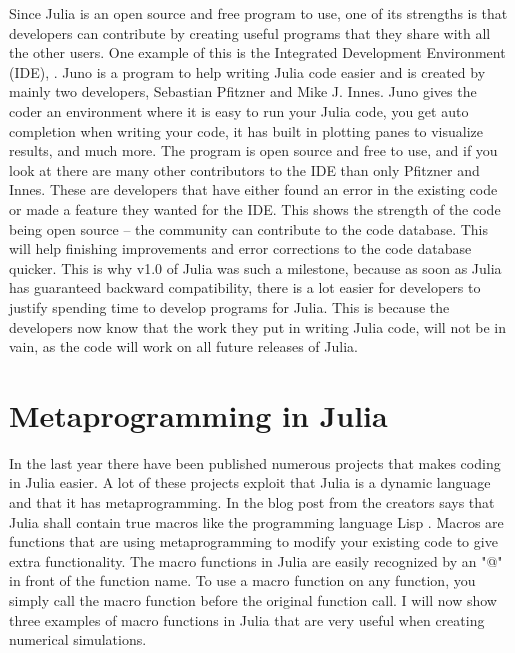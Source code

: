 Since Julia is an open source and free program to use, one of its strengths is that developers can contribute by creating useful programs that they share with all the other users. One example of this is the Integrated Development Environment (IDE), \cite{JunoIDE}. Juno is a program to help writing Julia code easier and is created by mainly two developers, Sebastian Pfitzner and Mike J. Innes. Juno gives the coder an environment where it is easy to run your Julia code, you get auto completion when writing your code, it has built in plotting panes to visualize results, and much more. The program is open source and free to use, and if you look at \cite{JunoGithub} there are many other contributors to the IDE than only Pfitzner and Innes. These are developers that have either found an error in the existing code or made a feature they wanted for the IDE. This shows the strength of the code being open source -- the community can contribute to the code database. This will help finishing improvements and error corrections to the code database quicker. This is why v1.0 of Julia was such a milestone, because as soon as Julia has guaranteed backward compatibility, there is a lot easier for developers to justify spending time to develop programs for Julia. This is because the developers now know that the work they put in writing Julia code, will not be in vain, as the code will work on all future releases of Julia. 

\section{Metaprogramming in Julia}
\label{sec:Metaprogramming}
In the last year there have been published numerous projects that makes coding in Julia easier. A lot of these projects exploit that Julia is a dynamic language and that it has metaprogramming. In the blog post from \cite{juliaBlogRelease2012} the creators says that Julia shall contain true macros like the programming language Lisp \emph{\citep{Lisp}}. Macros are functions that are using metaprogramming to modify your existing code to give extra functionality. The macro functions in Julia are easily recognized by an "@" in front of the function name. To use a macro function on any function, you simply call the macro function before the original function call. I will now show three examples of macro functions in Julia that are very useful when creating numerical simulations.

